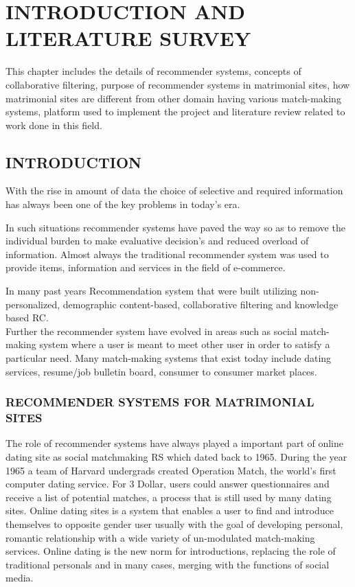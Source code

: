 \documentclass[12pt,oneside]{book}
\begin{document}
\chapter{INTRODUCTION AND LITERATURE SURVEY}
This chapter includes the details of recommender systems, concepts of collaborative filtering, purpose of recommender systems in matrimonial sites, how matrimonial sites are different from other domain having various match-making systems, platform used to implement the project and literature review related to work done in this field.
\section{INTRODUCTION}
With the rise in amount of data the choice of selective and required information has always been one of the key problems in today's era.

In such situations recommender systems have paved the way so as to remove the individual burden to make evaluative decision's and reduced overload of information. Almost always the traditional recommender system was used to provide items, information and services in the field of e-commerce.

In many past years Recommendation system that were built utilizing non-personalized, demographic content-based, collaborative filtering and knowledge based RC.\\Further the recommender system have evolved in areas such as social match-making system where a user is meant to meet other user in order to satisfy a particular need. Many match-making systems that exist today include dating services, resume/job bulletin board, consumer to consumer market places. 
\subsection{RECOMMENDER SYSTEMS FOR MATRIMONIAL SITES}
 The role of recommender systems have always played a important part of online dating site as social matchmaking RS which dated back to 1965. During the year 1965 a team of Harvard undergrads created Operation Match, the world's first computer dating service. For 3 Dollar, users could answer questionnaires and receive a list of potential matches, a process that is still used by many dating sites. Online dating sites is a system that enables a user to find and introduce themselves to opposite gender user usually with the goal of developing personal, romantic relationship with a wide variety of un-modulated match-making services. Online dating is the new norm for introductions, replacing the role of traditional personals and in many cases, merging with the functions of social media.
 
\end{document}

